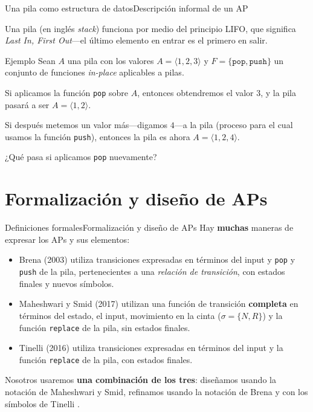 \documentclass[spanish]{beamer}
\begin{document}
\begin{frame}{Una pila como estructura de datos}{Descripción informal de un AP}

    Una \alert{pila} (en inglés \textit{stack}) funciona por medio del principio \alert{LIFO}, que significa \textit{Last In, First Out}---el último elemento en entrar es el primero en salir. \pause

    \bigskip

    \begin{exampleblock}{Ejemplo}
        Sean $A$ una pila con los valores $A = \langle 1, 2, 3 \rangle$ y $F = \{\mathtt{pop}, \mathtt{push}\}$ un conjunto de funciones \textit{in-place} aplicables a pilas.
    \end{exampleblock} \pause

    \bigskip

    Si aplicamos la función \texttt{pop} sobre $A$, entonces obtendremos el valor $3$, y la pila pasará a ser $A = \langle 1,2 \rangle$. \pause

    \bigskip
    
    Si después metemos un valor más---digamos $4$---a la pila (proceso para el cual usamos la función \texttt{push}), entonces la pila es ahora $A = \langle 1, 2, 4 \rangle$. \pause

    \bigskip
    
    ¿Qué pasa si aplicamos \texttt{pop} nuevamente?
\end{frame}

\section{Formalización y diseño de APs}

\begin{frame}{Definiciones formales}{Formalización y diseño de APs}
    Hay \textbf{muchas} maneras de expresar los APs y sus elementos: \pause
    \begin{itemize}
        \itemsep1.5ex
        \item Brena (2003) utiliza transiciones expresadas en términos del input y \texttt{pop} y \texttt{push} de la pila, pertenecientes a una \textit{relación de transición}, con estados finales y nuevos símbolos. \pause
        \item Maheshwari y Smid (2017) utilizan una función de transición \textbf{completa} en términos del estado, el input, movimiento en la cinta ($\sigma = \{N,R\}$) y la función \texttt{replace} de la pila, sin estados finales. \pause
        \item Tinelli (2016) utiliza transiciones expresadas en términos del input y la función \texttt{replace} de la pila, con estados finales. 
    \end{itemize} \pause

    \bigskip

    Nosotros usaremos \textbf{una combinación de los tres}: diseñamos usando la notación de Maheshwari y Smid, refinamos usando la notación de Brena y con los símbolos de Tinelli .
\end{frame}
\end{document}
